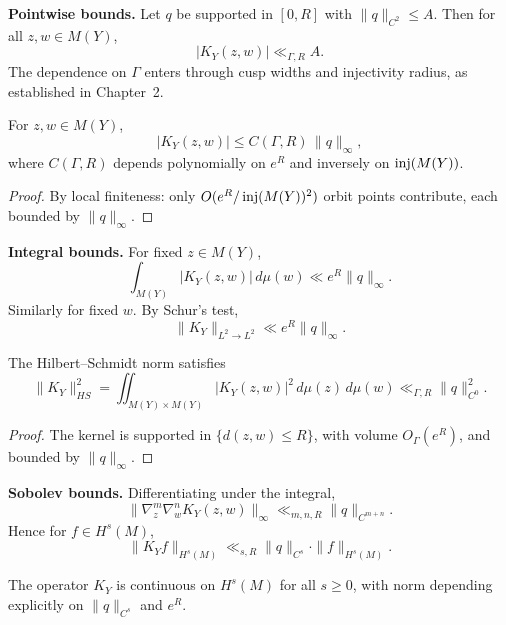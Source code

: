 \noindent\textbf{Pointwise bounds.}
Let $q$ be supported in $[0,R]$ with $\|q\|_{C^{2}}\le A$.
Then for all $z,w\in M(Y)$,
\[
  |K_{Y}(z,w)| \ll_{\Gamma,R} A.
\]
The dependence on $\Gamma$ enters through cusp widths and injectivity radius,
as established in Chapter~2.

\medskip

\begin{lemma}\label{lem:K-Y-Linfty}
For $z,w\in M(Y)$,
\[
  |K_{Y}(z,w)| \le C(\Gamma,R)\,\|q\|_{\infty},
\]
where $C(\Gamma,R)$ depends polynomially on $e^{R}$
and inversely on $\operatorname{inj}(M(Y))$.
\end{lemma}

\begin{proof}
By local finiteness: only $O(e^{R}/\operatorname{inj}(M(Y))^{2})$ orbit points contribute,
each bounded by $\|q\|_{\infty}$.
\end{proof}

\medskip

\noindent\textbf{Integral bounds.}
For fixed $z\in M(Y)$,
\[
  \int_{M(Y)} |K_{Y}(z,w)|\,d\mu(w) \ll e^{R}\|q\|_{\infty}.
\]
Similarly for fixed $w$.  
By Schur’s test,
\[
  \|K_{Y}\|_{L^{2}\to L^{2}} \ll e^{R}\|q\|_{\infty}.
\]

\medskip

\begin{lemma}\label{lem:HS-norm}
The Hilbert–Schmidt norm satisfies
\[
  \|K_{Y}\|_{HS}^{2}
  = \iint_{M(Y)\times M(Y)} |K_{Y}(z,w)|^{2}\,d\mu(z)\,d\mu(w)
  \ll_{\Gamma,R} \|q\|_{C^{0}}^{2}.
\]
\end{lemma}

\begin{proof}
The kernel is supported in $\{d(z,w)\le R\}$,
with volume $O_{\Gamma}(e^{R})$,
and bounded by $\|q\|_{\infty}$.
\end{proof}

\medskip

\noindent\textbf{Sobolev bounds.}
Differentiating under the integral,
\[
  \|\nabla_{z}^{m}\nabla_{w}^{n} K_{Y}(z,w)\|_{\infty}
  \ll_{m,n,R} \|q\|_{C^{m+n}}.
\]
Hence for $f\in H^{s}(M)$,
\[
  \|K_{Y}f\|_{H^{s}(M)} \ll_{s,R} \|q\|_{C^{s}}\cdot \|f\|_{H^{s}(M)}.
\]

\medskip

\begin{lemma}\label{lem:sobolev-continuity}
The operator $K_{Y}$ is continuous on $H^{s}(M)$ for all $s\ge 0$,
with norm depending explicitly on $\|q\|_{C^{s}}$ and $e^{R}$.
\end{lemma}

